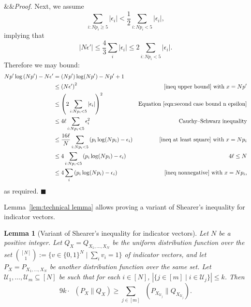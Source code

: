 \documentclass[11pt]{article}
\renewenvironment{proof}[1][]
    {\noindent
       \ifx&#1&{\it Proof.}
       \else{\it Proof ({#1}).}
       \fi}{\hfill $\blacksquare$}
\newtheorem{lemma}[theorem]{Lemma}
\DeclareMathOperator{\KL}{D_{\text{KL}}}
\newcommand{\ind}[1]{\binom{[#1]}{1}}
\begin{document}
\begin{proof}
\medskip \noindent Next, we assume
\[
    \sum_{i:Np_{i}\ge5}\left|\epsilon_{i}\right|<\frac{1}{2}\sum_{i:Np_{i}<5}\left|\epsilon_{i}\right|,
\]
implying that
\begin{equation}\label{eqn:second case bound n epsilon}
    \left|N\epsilon'\right|\le\frac{4}{3}\sum_{i}\left|\epsilon_{i}\right| \le 2 \sum_{i:Np_{i}<5} \left|\epsilon_{i}\right|.
\end{equation}
Therefore we may bound:
\begin{align*}
    Np'\log\left(Np'\right)-N\epsilon' & =  (Np')\log(Np')-Np'+1 &\\
    & \le  \left(N\epsilon'\right)^2 & \text{\ref{ineq upper bound} with $x=Np'$}\\
    & \le  \left(2\sum_{i:Np_{i}<5}\left|\epsilon_{i}\right|\right)^2 & \text{Equation \eqref{eqn:second case bound n epsilon}}\\
    & \le  4\ell\sum_{i:Np_{i}<5}\epsilon_{i}^{2} & \text{Cauchy–Schwarz inequality}\\
    & \le  \frac{16\ell}{N}\sum_{i:Np_{i}<5}\left(p_{i}\log(N p_{i})-\epsilon_{i}\right) & \text{\ref{ineq at least square} with $x=Np_i$}\\
    & \le  4\sum_{i:Np_{i}<5}\left(p_{i}\log(N p_{i})-\epsilon_{i}\right) & 4\ell\le N\\
    & \le  4\sum_{i}\left(p_{i}\log(Np_{i})-\epsilon_{i}\right) & \text{\ref{ineq nonnegative} with $x=Np_i$,}
\end{align*}
as required.
\end{proof}

\medskip \noindent Lemma~\ref{lem:technical lemma} allows proving a variant of Shearer's inequality for indicator vectors.
\begin{lemma}[Variant of Shearer's inequality for indicator vectors] 
\label{lem:shearer-indicator}
Let $N$ be a positive integer. Let $Q_X = Q_{X_1,\ldots,X_N}$ be the uniform distribution function over the set $\ind{N} := \{v \in \{0,1\}^N \mid \sum_i v_i=1\}$ of indicator vectors,
and let $P_X = P_{X_1,\ldots,X_N}$ be another distribution function over the same set. Let $\mathcal{U}_1,\ldots,\mathcal{U}_m \subseteq [N]$ be such that for each 
$i \in [N]$, $|\{ j \in [m] \mid i \in \mathcal{U}_{j} \} | \leq k$.
Then
$$9k \cdot  \KL( P_X \| Q_X ) \geq \sum_{j \in [m]} \KL( P_{X_{\mathcal{U}_j}} \| Q_{X_{\mathcal{U}_j}} ).$$
\end{lemma}
\end{document}
